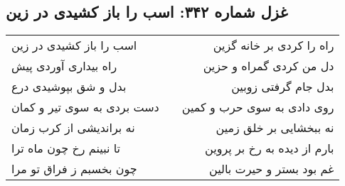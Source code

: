 \begin{center}
\section*{غزل شماره ۳۴۲: اسب را باز کشیدی در زین}
\label{sec:342}
\begin{longtable}{l p{0.5cm} r}
اسب را باز کشیدی در زین
&&
راه را کردی بر خانه گزین
\\
راه بیداری آوردی پیش
&&
دل من کردی گمراه و حزین
\\
بدل و شق بپوشیدی درع
&&
بدل جام گرفتی زوبین
\\
دست بردی به سوی تیر و کمان
&&
روی دادی به سوی حرب و کمین
\\
نه براندیشی از کرب زمان
&&
نه ببخشایی بر خلق زمین
\\
تا نبینم رخ چون ماه ترا
&&
بارم از دیده به رخ بر پروین
\\
چون بخسبم ز فراق تو مرا
&&
غم بود بستر و حیرت بالین
\\
\end{longtable}
\end{center}
